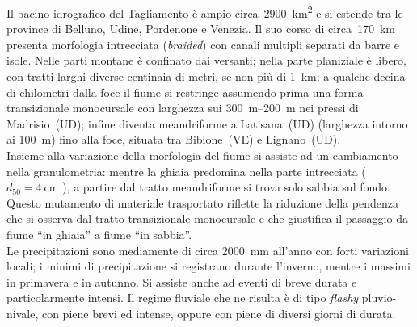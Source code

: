 Il bacino idrografico del Tagliamento è ampio circa~\SI{2900}{\kilo\m\tothe{2}} e si estende tra le province di Belluno, Udine, Pordenone e Venezia.
Il suo corso di circa~\SI{170}{\kilo\m} presenta morfologia intrecciata (\emph{braided}) con canali multipli separati da barre e isole.
Nelle parti montane è confinato dai versanti; 
nella parte planiziale è libero, con tratti larghi diverse centinaia di metri, se non più di \SI{1}{\kilo\m};
a qualche decina di chilometri dalla foce il fiume si restringe assumendo prima una forma transizionale monocursale con larghezza sui \SIrange[range-phrase={-}]{300}{200}{\m} nei pressi di Madrisio~(UD);
infine diventa meandriforme a Latisana~(UD) (larghezza intorno ai \SI{100}{\m}) fino alla foce, situata tra Bibione~(VE) e Lignano~(UD).
\\
Insieme alla variazione della morfologia del fiume si assiste ad un cambiamento nella granulometria: mentre la ghiaia predomina nella parte intrecciata ($d_{50} = \SI{4}{\centi\m}$ ), a partire dal tratto meandriforme si trova solo sabbia sul fondo.
Questo mutamento di materiale trasportato riflette la riduzione della pendenza che si osserva dal tratto transizionale monocursale e che giustifica il passaggio da fiume “in ghiaia” a fiume “in sabbia”.
\\
Le precipitazioni sono mediamente di circa \SI{2000}{\mm} all'anno con forti variazioni locali; i minimi di precipitazione si registrano durante l'inverno, mentre i massimi in primavera e in autunno.
Si assiste anche ad eventi di breve durata e particolarmente intensi.
Il regime fluviale che ne risulta è di tipo \emph{flashy} pluvio-nivale, con piene brevi ed intense, oppure con piene di diversi giorni di durata.

